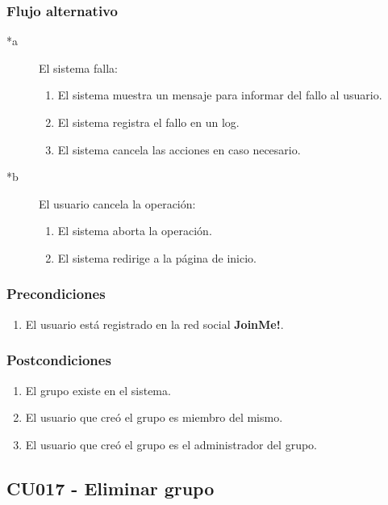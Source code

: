 \documentclass[12pt, a4paper, titlepage]{article}
\begin{document}
\subsubsection{Flujo alternativo}
	\begin{description}
		\item [*a] El sistema falla:
			\begin{enumerate}
				\item El sistema muestra un mensaje para informar del fallo al usuario.
				\item El sistema registra el fallo en un log.
				\item El sistema cancela las acciones en caso necesario.
			\end{enumerate}
	\end{description}

	\begin{description}
		\item [*b] El usuario cancela la operación:
			\begin{enumerate}
				\item El sistema aborta la operación.
				\item El sistema redirige a la página de inicio.
			\end{enumerate}
	\end{description}
\subsubsection{Precondiciones}
	\begin{enumerate}
		\item El usuario está registrado en la red social \textbf{JoinMe!}.
	\end{enumerate}
\subsubsection{Postcondiciones}
	\begin{enumerate}
		\item El grupo existe en el sistema.
		\item El usuario que creó el grupo es miembro del mismo.
		\item El usuario que creó el grupo es el administrador del grupo.
	\end{enumerate}


\subsection{CU017 - Eliminar grupo}
\end{document}
